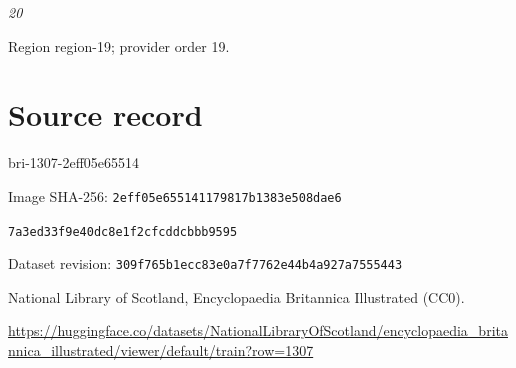 \documentclass[11pt]{article}
\begin{document}
{\small\itshape 20\par}

{\scriptsize\color{gray} Region region-19; provider order 19.\par}
\medskip
\newpage\section*{Source record}
bri-1307-2eff05e65514\par
Image SHA-256: \texttt{2eff05e655141179817b1383e508dae6}\par\texttt{7a3ed33f9e40dc8e1f2cfcddcbbb9595}\par
Dataset revision: \texttt{309f765b1ecc83e0a7f7}\texttt{762e44b4a927a7555443}\par
National Library of Scotland, Encyclopaedia Britannica Illustrated (CC0).\par
\url{https://huggingface.co/datasets/NationalLibraryOfScotland/encyclopaedia_britannica_illustrated/viewer/default/train?row=1307}
\end{document}
